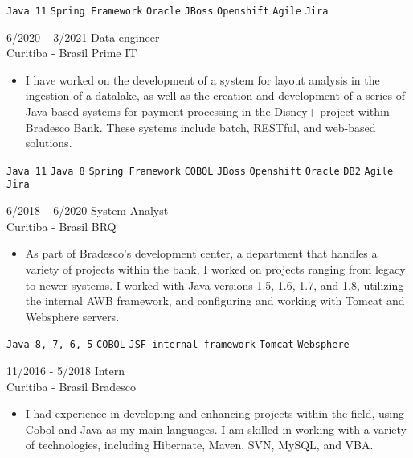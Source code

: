 \documentclass[9pt]{developercv} %
\begin{document}
\begin{entrylist}
{\begin{itemize}[noitemsep,topsep=0pt,parsep=0pt,partopsep=0pt, leftmargin=-1pt]
        \end{itemize} 
        \texttt{Java 11} \slashsep \texttt{Spring Framework} \slashsep \texttt{Oracle} \slashsep \texttt{JBoss} \slashsep \texttt{Openshift} \slashsep \texttt{Agile} \slashsep \texttt{Jira}}
	\entry
		{6/2020 -- 3/2021}
		{Data engineer \\\footnotesize{Curitiba - Brasil}}
		{Prime IT}
		{\vspace{-10pt}
        \begin{itemize}[noitemsep,topsep=0pt,parsep=0pt,partopsep=0pt, leftmargin=-1pt]
            \item I have worked on the development of a system for layout analysis in the ingestion of a datalake, as well as the creation and development of a series of Java-based systems for payment processing in the Disney+ project within Bradesco Bank. These systems include batch, RESTful, and web-based solutions.
        \end{itemize} 
        \texttt{Java 11} \slashsep \texttt{Java 8} \slashsep \texttt{Spring Framework} \slashsep \texttt{COBOL} \slashsep \texttt{JBoss} \slashsep \texttt{Openshift} \slashsep \texttt{Oracle} \slashsep \texttt{DB2} \slashsep \texttt{Agile} \slashsep \texttt{Jira}}
        \entry
		{6/2018 -- 6/2020}
		{System Analyst \\\footnotesize{Curitiba - Brasil}}
		{BRQ}
		{\vspace{-10pt}
        \begin{itemize}[noitemsep,topsep=0pt,parsep=0pt,partopsep=0pt, leftmargin=-1pt]
            \item As part of Bradesco's development center, a department that handles a variety of projects within the bank, I worked on projects ranging from legacy to newer systems. I worked with Java versions 1.5, 1.6, 1.7, and 1.8, utilizing the internal AWB framework, and configuring and working with Tomcat and Websphere servers.
        \end{itemize} 
        \texttt{Java 8, 7, 6, 5} \slashsep \texttt{COBOL} \slashsep \texttt{JSF internal framework} \slashsep \texttt{Tomcat} \slashsep \texttt{Websphere} \slashsep}
        \entry
		{11/2016 - 5/2018}
		{Intern \\\footnotesize{Curitiba - Brasil}}
		{Bradesco}
		{\vspace{-10pt}
        \begin{itemize}[noitemsep,topsep=0pt,parsep=0pt,partopsep=0pt, leftmargin=-1pt]
            \item I had experience in developing and enhancing projects within the field, using Cobol and Java as my main languages. I am skilled in working with a variety of technologies, including Hibernate, Maven, SVN, MySQL, and VBA.

\end{itemize}}
\end{entrylist}
\end{document}
